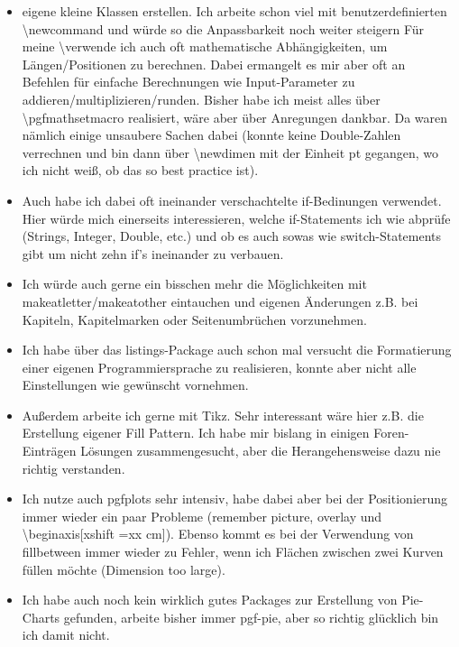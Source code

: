 \documentclass[ngerman]{beamer}
\begin{document}
\begin{frame}[allowframebreaks]

\begin{itemize}
\item eigene kleine Klassen erstellen. Ich arbeite schon viel mit benutzerdefinierten \textbackslash newcommand und würde so die Anpassbarkeit noch weiter steigern
Für meine \textbackslash  verwende ich auch oft mathematische Abhängigkeiten, um Längen/Positionen zu berechnen. Dabei ermangelt es mir aber oft an Befehlen für einfache Berechnungen wie Input-Parameter zu addieren/multiplizieren/runden. Bisher habe ich meist alles über \textbackslash  pgfmathsetmacro realisiert, wäre aber über Anregungen dankbar. Da waren nämlich einige unsaubere Sachen dabei (konnte keine Double-Zahlen verrechnen und bin dann über \textbackslash  newdimen mit der Einheit pt gegangen, wo ich nicht weiß, ob das so best practice ist).
\item 
Auch habe ich dabei oft ineinander verschachtelte if-Bedinungen verwendet. Hier würde mich einerseits interessieren, welche if-Statements ich wie abprüfe (Strings, Integer, Double, etc.) und ob es auch sowas wie switch-Statements gibt um nicht zehn if’s ineinander zu verbauen.

\item Ich würde auch gerne ein bisschen mehr die Möglichkeiten mit makeatletter/makeatother eintauchen und eigenen Änderungen z.B. bei Kapiteln, Kapitelmarken oder Seitenumbrüchen vorzunehmen.

\item Ich habe über das listings-Package auch schon mal versucht die Formatierung einer eigenen Programmiersprache zu realisieren, konnte aber nicht alle Einstellungen wie gewünscht vornehmen.

\item 
Außerdem arbeite ich gerne mit Tikz. Sehr interessant wäre hier z.B. die Erstellung eigener Fill Pattern. Ich habe mir bislang in einigen Foren-Einträgen Lösungen zusammengesucht, aber die Herangehensweise dazu nie richtig verstanden.

\item Ich nutze auch pgfplots sehr intensiv, habe dabei aber bei der Positionierung immer wieder ein paar Probleme (remember picture, overlay und \textbackslash  begin{axis}[xshift =xx cm]).
Ebenso kommt es bei der Verwendung von fillbetween immer wieder zu Fehler, wenn ich Flächen zwischen zwei Kurven füllen möchte (Dimension too large).
\item 
Ich habe auch noch kein wirklich gutes Packages zur Erstellung von Pie-Charts gefunden, arbeite bisher immer pgf-pie, aber so richtig glücklich bin ich damit nicht.

\end{itemize}
\end{frame}
\end{document}
